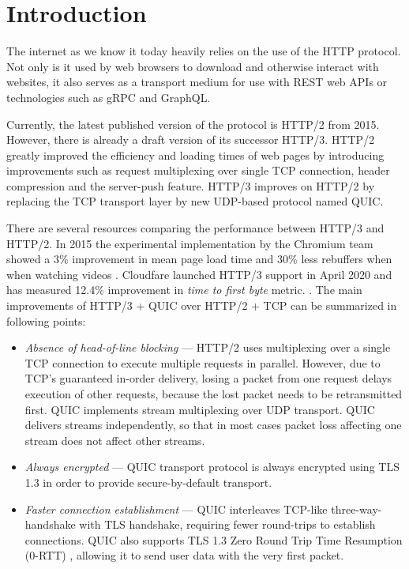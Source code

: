 \chapter{Introduction}

The internet as we know it today heavily relies on the use of the HTTP protocol. Not only is it used
by web browsers to download and otherwise interact with websites, it also serves as a transport
medium for use with REST web APIs or technologies such as gRPC and GraphQL.

Currently, the latest published version of the protocol is HTTP/2  from
2015. However, there is already a draft version of its successor HTTP/3. HTTP/2 greatly improved the
efficiency and loading times of web pages by introducing improvements such as request multiplexing
over single TCP connection, header compression and the server-push feature. HTTP/3 improves on
HTTP/2 by replacing the TCP transport layer by new UDP-based protocol named QUIC.

There are several resources comparing the performance between HTTP/3 and HTTP/2. In 2015 the
experimental implementation by the Chromium team showed a 3\% improvement in mean page load time and
30\% less rebuffers when when watching videos
. Cloudfare
launched HTTP/3 support in April 2020 and has measured 12.4\% improvement in \textit{time to first
byte} metric. . The main improvements of HTTP/3
+ QUIC over HTTP/2 + TCP can be summarized in following points:

\begin{itemize}
  \item \textit{Absence of head-of-line blocking} ---
    HTTP/2 uses multiplexing over a single TCP connection to execute multiple requests in parallel.
    However, due to TCP's guaranteed in-order delivery, losing a packet from one request delays
    execution of other requests, because the lost packet needs to be retransmitted first. QUIC
    implements stream multiplexing over UDP transport. QUIC delivers streams independently, so that in
    most cases packet loss affecting one stream does not affect other streams.

  \item \textit{Always encrypted} ---
    QUIC transport protocol is always encrypted using TLS 1.3 in order to provide secure-by-default
    transport.

  \item \textit{Faster connection establishment} ---
    QUIC interleaves TCP-like three-way-handshake with TLS handshake, requiring fewer round-trips to
    establish connections. QUIC also supports TLS 1.3 Zero Round Trip Time Resumption (0-RTT)
    , allowing it to send user data
    with the very first packet.

\end{itemize}

